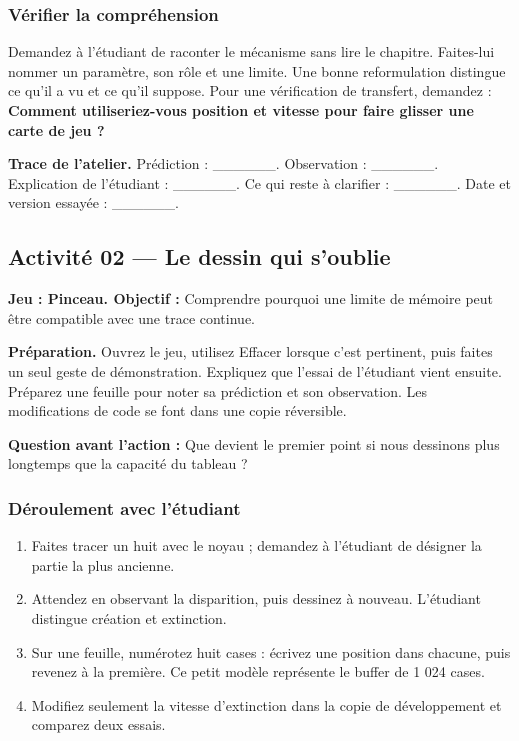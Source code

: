 \documentclass[
  canadien,
  11pt,
  letterpaper,
]{article}
\providecommand{\tightlist}{%
  \setlength{\itemsep}{0pt}\setlength{\parskip}{0pt}}
\begin{document}
\subsubsection{Vérifier la
compréhension}\label{vuxe9rifier-la-compruxe9hension}

Demandez à l'étudiant de raconter le mécanisme sans lire le chapitre.
Faites-lui nommer un paramètre, son rôle et une limite. Une bonne
reformulation distingue ce qu'il a vu et ce qu'il suppose. Pour une
vérification de transfert, demandez : \textbf{Comment utiliseriez-vous
position et vitesse pour faire glisser une carte de jeu ?}

\textbf{Trace de l'atelier.} Prédiction : \_\_\_\_\_\_. Observation :
\_\_\_\_\_\_. Explication de l'étudiant : \_\_\_\_\_\_. Ce qui reste à
clarifier : \_\_\_\_\_\_. Date et version essayée : \_\_\_\_\_\_.

\subsection{Activité 02 --- Le dessin qui
s'oublie}\label{activituxe9-02-le-dessin-qui-soublie}

\textbf{Jeu : Pinceau. Objectif :} Comprendre pourquoi une limite de
mémoire peut être compatible avec une trace continue.

\textbf{Préparation.} Ouvrez le jeu, utilisez Effacer lorsque c'est
pertinent, puis faites un seul geste de démonstration. Expliquez que
l'essai de l'étudiant vient ensuite. Préparez une feuille pour noter sa
prédiction et son observation. Les modifications de code se font dans
une copie réversible.

\textbf{Question avant l'action :} Que devient le premier point si nous
dessinons plus longtemps que la capacité du tableau ?

\subsubsection{Déroulement avec
l'étudiant}\label{duxe9roulement-avec-luxe9tudiant-1}

\begin{enumerate}
\def\labelenumi{\arabic{enumi}.}
\tightlist
\item
  Faites tracer un huit avec le noyau ; demandez à l'étudiant de
  désigner la partie la plus ancienne.
\item
  Attendez en observant la disparition, puis dessinez à nouveau.
  L'étudiant distingue création et extinction.
\item
  Sur une feuille, numérotez huit cases : écrivez une position dans
  chacune, puis revenez à la première. Ce petit modèle représente le
  buffer de 1 024 cases.
\item
  Modifiez seulement la vitesse d'extinction dans la copie de
  développement et comparez deux essais.
\end{enumerate}
\end{document}
